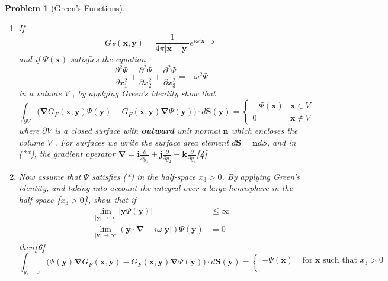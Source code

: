 \documentclass[a4paper]{article}
\theoremstyle{new}
\newtheorem{qns}{Problem}[section]
\begin{document}
\begin{qns}[Green's Functions]\leavevmode
\begin{enumerate}[label=(\roman*)]
    \item If
$$G_F(\mathbf{x},\mathbf{y})=\frac{1}{4\pi|\mathbf{x}-\mathbf{y}|}e^{i\omega|\mathbf{x}-\mathbf{y}|}$$
and if $\Psi(\mathbf{x})$ satisfies the equation
\begin{equation}
  \frac{\partial^2\Psi}{\partial x_1^2}+\frac{\partial^2\Psi}{\partial x_2^2}+\frac{\partial^2\Psi}{\partial x_3^2}=-\omega^2\Psi\tag{*}  
\end{equation}
in a volume $V$ , by applying Green’s identity show that
\begin{equation}
    \int_{\partial V}\bigg(\boldsymbol{\nabla}G_F(\mathbf{x},\mathbf{y})\Psi(\mathbf{y})-G_F(\mathbf{x},\mathbf{y})\boldsymbol{\nabla}\Psi(\mathbf{y})\bigg)\cdot d\mathbf{S}(\mathbf{y})=
\left\{
        \begin{array}{ll}
      -\Psi(\mathbf{x}) & \mathbf{x}\in V \\
      0 & \mathbf{x}\notin V
        \end{array}
    \right.\tag{**}
\end{equation}
where $\partial V$ is a closed surface with \textbf{outward} unit normal $\mathbf{n}$ which encloses the volume $V$ . For surfaces we write the surface area element $d\mathbf{S} = \mathbf{n}dS$, and in (**), the gradient
operator $\boldsymbol{\nabla}=\mathbf{i}\frac{\partial}{\partial y_1}+\mathbf{j}\frac{\partial}{\partial y_2}+\mathbf{k}\frac{\partial}{\partial y_3}$\hfill\textbf{[4]}
\item Now assume that $\Psi$ satisfies (*) in the half-space {$x_3 > 0$}. By applying Green’s identity, and taking into account the integral over a large hemisphere in the half-space \{$x_3 > 0$\}, show that if
\begin{align}
    \lim_{|\mathbf{y}|\rightarrow\infty}|\mathbf{y}\Psi(\mathbf{y})|&\leq\infty\nonumber\\
    \lim_{|\mathbf{y}|\rightarrow\infty}(\mathbf{y}\cdot\boldsymbol{\nabla}-i\omega|\mathbf{y}|)\Psi(\mathbf{y})&=0\nonumber
    \tag{\dag}
\end{align}
then\hfill\textbf{[6]}
$$\int_{y_3=0}\bigg(\Psi(\mathbf{y})\boldsymbol{\nabla}G_F(\mathbf{x},\mathbf{y})-G_F(\mathbf{x},\mathbf{y})\boldsymbol{\nabla}\Psi(\mathbf{y})\bigg)\cdot d\mathbf{S}(\mathbf{y})=
\left\{
        \begin{array}{ll}
      -\Psi(\mathbf{x}) & \text{ for }\mathbf{x}\text{ such that }x_3>0 \\

\end{array}$$
\end{enumerate}
\end{qns}
\end{document}
